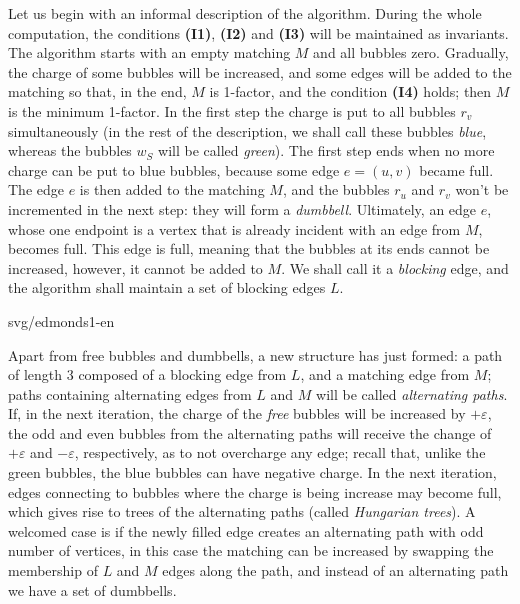 \noindent
Let us begin with an informal description of the algorithm. During the whole computation, the 
conditions  {\bf (I1)}, {\bf (I2)} and {\bf (I3)} will be maintained as invariants. The algorithm starts with
an empty matching $M$ and all bubbles zero. Gradually, the charge of some bubbles will be increased, and 
some edges will be added to the matching so that, in the end, $M$ is 1-factor, and the condition  {\bf (I4)}
holds; then $M$ is the minimum 1-factor. In the first step the charge is put to all bubbles $r_v$ simultaneously
(in the rest of the description, we shall call these bubbles {\em blue}, whereas the bubbles
$w_S$ will be called {\em green}). The first step ends when no more charge can be put to blue bubbles, 
because some edge $e=(u,v)$ became full. The edge $e$ is then added to the matching $M$, and the bubbles
$r_u$ and $r_v$ won't be incremented in the next step: they will form a {\em dumbbell}. Ultimately, 
an edge $e$, whose one endpoint is a vertex that is already incident with an edge from $M$, becomes full.
This edge is full, meaning that the bubbles at its ends cannot be increased, however, it cannot be added to $M$.
We shall call it a  {\em blocking} edge, and the algorithm shall maintain a set of blocking edges $L$.



\begin{myfig}{0.6\textwidth}{svg/edmonds1-en}
\end{myfig}

\noindent
Apart from free bubbles and dumbbells, a new structure has just formed: a path of length 3 composed of 
a blocking edge from $L$, and a matching edge from $M$; paths containing alternating edges from $L$ and $M$
will be called {\em alternating paths}. If, in the next iteration, the charge of the {\em free } bubbles 
will be increased by $+\varepsilon$, the odd and even bubbles from the alternating paths will receive 
the change of $+\varepsilon$ and $-\varepsilon$, respectively, as to not overcharge any edge; recall that,
unlike the green bubbles, the blue bubbles can have negative charge. In the next iteration, edges connecting
to bubbles where the charge is being increase may become full, which gives rise to trees of the alternating paths
(called {\em Hungarian trees}). A welcomed case is if the newly filled edge creates an alternating path with odd 
number of vertices, in this case the matching can be increased by swapping the membership of $L$ and $M$ edges 
along the path, and instead of an alternating path we have a set of dumbbells.


